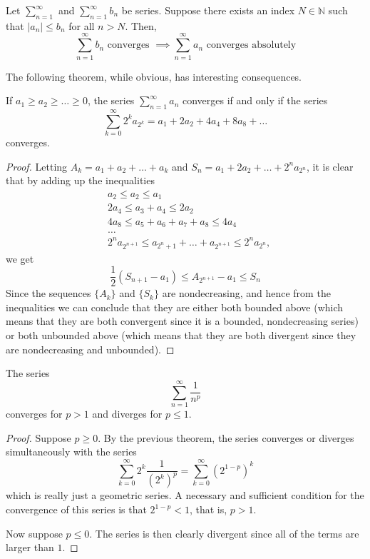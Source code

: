 \documentclass{article}
\begin{document}
      \begin{theorem}
      Let $\sum_{n=1}^\infty$ and $\sum_{n=1}^\infty b_n$ be series. Suppose there exists an index $N \in \mathbb{N}$ such that $|a_n| \leq b_n$ for all $n>N$. Then, 
      \[\sum_{n=1}^\infty b_n \text{ converges } \implies \sum_{n=1}^\infty a_n \text{ converges absolutely}\]
      \end{theorem}

      The following theorem, while obvious, has interesting consequences. 

      \begin{theorem}[Cauchy]
      If $a_1 \geq a_2 \geq \ldots \geq 0$, the series $\sum_{n=1}^\infty a_n$ converges if and only if the series 
      \[\sum_{k=0}^\infty 2^k a_{2^k} = a_1 + 2 a_2 + 4a_4 + 8a_8 + \ldots \]
      converges. 
      \end{theorem}
      \begin{proof}
      Letting $A_k = a_1 + a_2 + \ldots + a_k$ and $S_n = a_1 + 2a_2 + \ldots + 2^n a_{2^n}$, it is clear that by adding up the inequalities
      \begin{align*}
          & a_2 \leq a_2 \leq a_1 \\
          & 2a_4 \leq a_3 + a_4 \leq 2a_2 \\
          & 4a_8 \leq a_5 + a_6 + a_7 + a_8 \leq 4a_4 \\
          & \ldots \\
          & 2^n a_{2^{n+1}} \leq a_{2^n + 1} + \ldots + a_{2^{n+1}} \leq 2^n a_{2^n}, 
      \end{align*}
      we get
      \[\frac{1}{2}(S_{n+1} - a_1) \leq A_{2^{n+1}} - a_1 \leq S_n\]
      Since the sequences $\{A_k\}$ and $\{S_k\}$ are nondecreasing, and hence from the inequalities we can conclude that they are either both bounded above (which means that they are both convergent since it is a bounded, nondecreasing series) or both unbounded above (which means that they are both divergent since they are nondecreasing and unbounded). 
      \end{proof}

      \begin{corollary}
      The series 
      \[\sum_{n=1}^\infty \frac{1}{n^p}\]
      converges for $p>1$ and diverges for $p \leq 1$. 
      \end{corollary}
      \begin{proof}
      Suppose $p\geq 0$. By the previous theorem, the series converges or diverges simultaneously with the series 
      \[\sum_{k=0}^\infty 2^k \frac{1}{(2^k)^p} = \sum_{k=0}^\infty (2^{1-p})^k\]
      which is really just a geometric series. A necessary and sufficient condition for the convergence of this series is that $2^{1-p} < 1$, that is, $p>1$. 

      Now suppose $p \leq 0$. The series is then clearly divergent since all of the terms are larger than $1$. 
      \end{proof}
\end{document}
